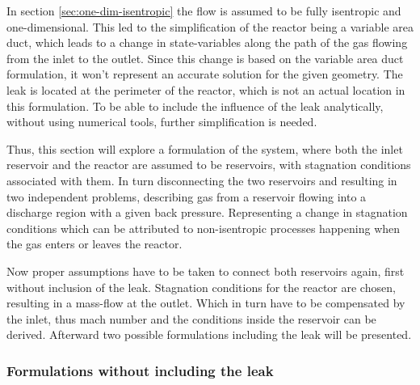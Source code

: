 In section \ref{sec:one-dim-isentropic} the flow is assumed to be fully isentropic and one-dimensional.
This led to the simplification of the reactor being a variable area duct, which leads to a change in state-variables along the path of the gas flowing from the inlet to the outlet.
Since this change is based on the variable area duct formulation, it won't represent an accurate solution for the given geometry.
The leak is located at the perimeter of the reactor, which is not an actual location in this formulation.
To be able to include the influence of the leak analytically, without using numerical tools, further simplification is needed.

Thus, this section will explore a formulation of the system, where both the inlet reservoir and the reactor are assumed to be reservoirs, with stagnation conditions associated with them.
In turn disconnecting the two reservoirs and resulting in two independent problems, describing gas from a reservoir flowing into a discharge region with a given back pressure. 
Representing a change in stagnation conditions which can be attributed to non-isentropic processes happening when the gas enters or leaves the reactor.

Now proper assumptions have to be taken to connect both reservoirs again, first without inclusion of the leak.
Stagnation conditions for the reactor are chosen, resulting in a mass-flow at the outlet.
Which in turn have to be compensated by the inlet, thus mach number and the conditions inside the reservoir can be derived.  
Afterward two possible formulations including the leak will be presented.

\subsubsection*{Formulations without including the leak}

